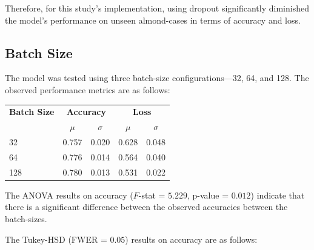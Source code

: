 Therefore, for this study's implementation, using dropout significantly diminished the model's
performance on unseen almond-cases in terms of accuracy and loss. 

\subsection{Batch Size}

The model was tested using three batch-size configurations—32, 64, and 128. The observed performance metrics are as follows: \\

\noindent
\footnotesize
\setlength{\tabcolsep}{6pt} %
\renewcommand{\arraystretch}{1.0} %
\begin{center}
\begin{tabular}{l|cc|cc}
\toprule
\textbf{Batch Size} & \multicolumn{2}{c|}{\textbf{Accuracy}} & \multicolumn{2}{c}{\textbf{Loss}} \\
\cmidrule(r){2-3} \cmidrule(l){4-5}
 & $\mu$ & $\sigma$ & $\mu$ & $\sigma$ \\
\midrule 
32   & 0.757 & 0.020 & 0.628 & 0.048 \\
64   & 0.776 & 0.014 & 0.564 & 0.040 \\
128  & 0.780 & 0.013 & 0.531 & 0.022 \\
\bottomrule
\end{tabular}
\end{center}

\normalsize

\vspace{0.7em}

The ANOVA results on accuracy ($F$-stat = $5.229$, p-value = $0.012$) indicate that there is a significant 
difference between the observed accuracies between the batch-sizes.

The Tukey-HSD (FWER = $0.05$) results on accuracy are as follows: \\

\noindent
{} \\

